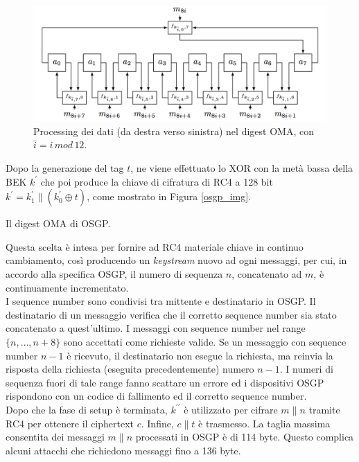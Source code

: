 \begin{figure}[hbtp]
	\centering
	\includegraphics[scale=.3]{imgs/attack/oma_innerloop.png}
	\caption{Processing dei dati (da destra verso sinistra) nel digest OMA, con $\bar i = i\,mod\,12$.}
	\label{inneroma_img}
\end{figure}
Dopo la generazione del tag $t$, ne viene effettuato lo XOR con la metà bassa della BEK $k^\prime$ che poi produce la chiave di cifratura di RC4 a 128 bit $k^{\prime} = k^\prime_1 \| (k^\prime_0 \oplus t)$, come mostrato in Figura \ref{osgp_img}.
\begin{algorithm}[H]
\caption{Il digest OMA di OSGP.}
\label{oma_algo1}
\end{algorithm}
Questa scelta è intesa per fornire ad RC4 materiale chiave in continuo cambiamento, così producendo un \textit{keystream} nuovo ad ogni messaggi, per cui, in accordo alla specifica OSGP, il numero di sequenza $n$, concatenato ad $m$, è continuamente incrementato.\\
I sequence number sono condivisi tra mittente e destinatario in OSGP. Il destinatario di un messaggio verifica che il corretto sequence number sia stato concatenato a quest'ultimo. I messaggi con sequence number nel range $\{n, \ldots, n+8\}$ sono accettati come richieste valide. Se un messaggio con sequence number $n-1$ è ricevuto, il destinatario non esegue la richiesta, ma reinvia la risposta della richiesta (eseguita precedentemente) numero $n-1$. I numeri di sequenza fuori di tale range fanno scattare un errore ed i dispositivi OSGP rispondono con un codice di fallimento ed il corretto sequence number.\\
Dopo che la fase di setup è terminata, $k^{\prime\prime}$ è utilizzato per cifrare $m\|n$ tramite RC4 per ottenere il ciphertext $c$. Infine, $c\|t$ è trasmesso. La taglia massima consentita dei messaggi $m\|n$ processati in OSGP è di 114 byte. Questo complica alcuni attacchi che richiedono messaggi fino a 136 byte.

